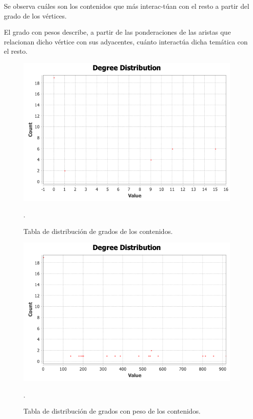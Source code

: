 \documentclass[a4paper,10pt,twocolumn]{article}
\begin{document}
        Se observa cuáles son los contenidos que más interac-túan con el resto a partir del grado de los vértices. 
        
        El grado con pesos describe, a partir de las ponderaciones de las aristas que relacionan dicho vértice con sus adyacentes, cuánto interactúa dicha temática con el resto.

        
        \begin{figure}[h!]
            \centering
            \includegraphics[scale=0.35]{degree-distribution.png}
            \caption{Tabla de distribución de grados de los contenidos. \label{fig:ex}}
.        \end{figure}

        \begin{figure}[h!]
            \centering
            \includegraphics[scale=0.35]{w-degree-distribution.png}
            \caption{Tabla de distribución de grados con peso de los contenidos. \label{fig:ex}}
.        \end{figure}
\end{document}

